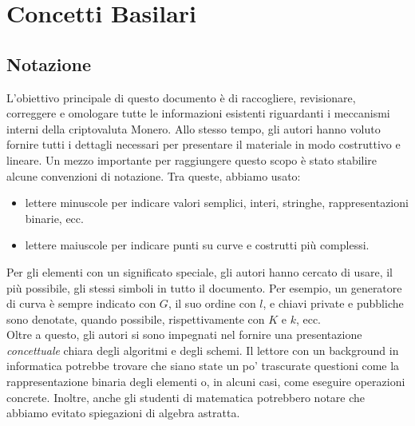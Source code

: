 \chapter{Concetti Basilari}
\label{chapter:basicConcepts}



\section{Notazione}

L'obiettivo principale di questo documento è di raccogliere, revisionare, correggere e omologare tutte le informazioni esistenti riguardanti i meccanismi interni della criptovaluta Monero. Allo stesso tempo, gli autori hanno voluto fornire tutti i dettagli necessari per presentare il materiale in modo costruttivo e lineare.
Un mezzo importante per raggiungere questo scopo è stato stabilire alcune convenzioni di notazione.
Tra queste, abbiamo usato:

\begin{itemize}
\item lettere minuscole per indicare valori semplici, interi, stringhe, rappresentazioni binarie, ecc.
\item lettere maiuscole per indicare punti su curve e costrutti più complessi.
\end{itemize}

Per gli elementi con un significato speciale, gli autori hanno cercato di usare, il più possibile, gli stessi simboli in tutto il documento. Per esempio, un generatore di curva è sempre indicato con \(G\), il suo ordine con \(l\), e chiavi private e pubbliche sono denotate, quando possibile, rispettivamente con \(K\) e \(k\), ecc.
\\

Oltre a questo, gli autori si sono impegnati nel fornire una presentazione {\em concettuale} chiara degli algoritmi e degli schemi. Il lettore con un background in informatica potrebbe trovare che siano state un po' trascurate questioni come la rappresentazione binaria degli elementi o, in alcuni casi, come eseguire operazioni concrete. Inoltre, anche gli studenti di matematica potrebbero notare che abbiamo evitato spiegazioni di algebra astratta.

